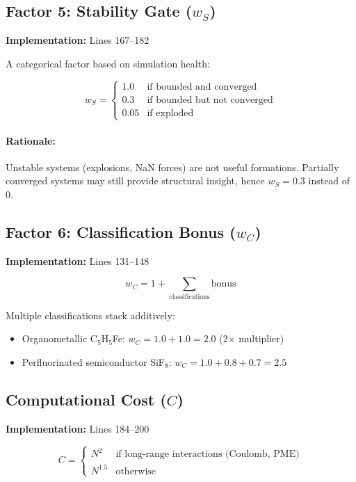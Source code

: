\documentclass[11pt]{article}
\begin{document}
\subsection{Factor 5: Stability Gate ($w_S$)}

\textbf{Implementation:} Lines 167--182

A categorical factor based on simulation health:

\begin{equation}
w_S = \begin{cases}
1.0 & \text{if bounded and converged} \\
0.3 & \text{if bounded but not converged} \\
0.05 & \text{if exploded}
\end{cases}
\end{equation}

\paragraph{Rationale:} Unstable systems (explosions, NaN forces) are not useful formations. Partially converged systems may still provide structural insight, hence $w_S = 0.3$ instead of 0.

\subsection{Factor 6: Classification Bonus ($w_C$)}

\textbf{Implementation:} Lines 131--148

\begin{equation}
w_C = 1 + \sum_{\text{classifications}} \text{bonus}
\end{equation}

Multiple classifications stack additively:
\begin{itemize}
\item Organometallic C$_5$H$_5$Fe: $w_C = 1.0 + 1.0 = 2.0$ (2$\times$ multiplier)
\item Perfluorinated semiconductor SiF$_8$: $w_C = 1.0 + 0.8 + 0.7 = 2.5$
\end{itemize}

\subsection{Computational Cost ($C$)}

\textbf{Implementation:} Lines 184--200

\begin{equation}
C = \begin{cases}
N^2 & \text{if long-range interactions (Coulomb, PME)} \\
N^{1.5} & \text{otherwise}
\end{cases}
\end{equation}
\end{document}
